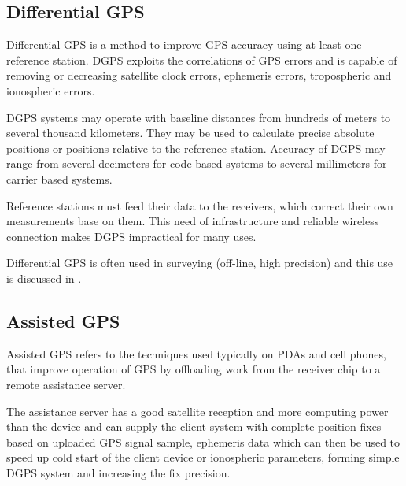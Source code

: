 \subsection{Differential GPS}
\label{sec:dgps}

Differential GPS is a method to improve GPS accuracy using at least one reference station.
DGPS exploits the correlations of GPS errors and is capable of removing or decreasing satellite clock errors,
ephemeris errors, tropospheric and ionospheric errors.

DGPS systems may operate with baseline distances from hundreds of meters to several thousand kilometers.
They may be used to calculate precise absolute positions or positions relative to the reference station.
Accuracy of DGPS may range from several decimeters for code based systems to several
millimeters for carrier based systems.

Reference stations must feed their data to the receivers, which correct their own measurements base on them.
This need of infrastructure and reliable wireless connection makes DGPS impractical for many uses.


Differential GPS is often used in surveying (off-line, high precision) and this
use is discussed in \cite{rizos99}.

\subsection{Assisted GPS}
Assisted GPS refers to the techniques used typically on PDAs and cell phones, that improve operation of GPS by offloading
work from the receiver chip to a remote assistance server.

The assistance server has a good satellite reception and more computing power than the device
and can supply the client system with complete position fixes based on uploaded GPS signal sample,
ephemeris data which can then be used to speed up cold start of the client device or
ionospheric parameters, forming simple DGPS system and increasing the fix precision.



